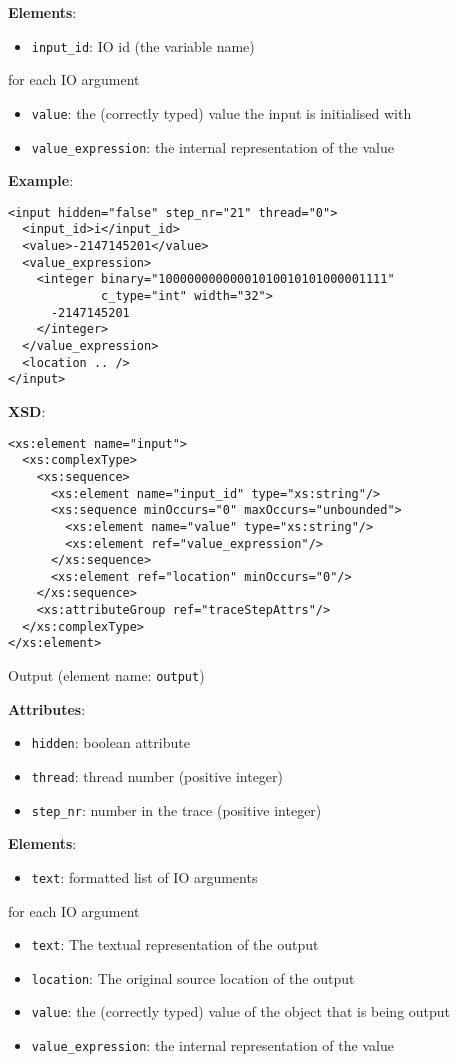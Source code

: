 \documentclass[12pt]{article}
\begin{document}
\noindent\textbf{Elements}:
\begin{itemize}
\item \texttt{input\_id}: IO id (the variable name)
\end{itemize}
for each IO argument
\begin{itemize}
\item \texttt{value}: the (correctly typed) value the input is initialised with
\item \texttt{value\_expression}: the internal representation of the value
\end{itemize}

\noindent\textbf{Example}:
\begin{verbatim}
<input hidden="false" step_nr="21" thread="0">
  <input_id>i</input_id>
  <value>-2147145201</value>
  <value_expression>
    <integer binary="10000000000001010010101000001111"
             c_type="int" width="32">
      -2147145201
    </integer>
  </value_expression>
  <location .. />
</input>
\end{verbatim}

\noindent\textbf{XSD}:
\begin{verbatim}
<xs:element name="input">
  <xs:complexType>
    <xs:sequence>
      <xs:element name="input_id" type="xs:string"/>
      <xs:sequence minOccurs="0" maxOccurs="unbounded">
        <xs:element name="value" type="xs:string"/>
        <xs:element ref="value_expression"/>
      </xs:sequence>
      <xs:element ref="location" minOccurs="0"/>
    </xs:sequence>
    <xs:attributeGroup ref="traceStepAttrs"/>
  </xs:complexType>
</xs:element>
\end{verbatim}


\begin{center}
  {\Large Output} (element name: \texttt{output})
\end{center}

\noindent\textbf{Attributes}:
\begin{itemize}
\item \texttt{hidden}: boolean attribute
\item \texttt{thread}: thread number (positive integer)
\item \texttt{step\_nr}: number in the trace (positive integer)
\end{itemize}

\noindent\textbf{Elements}:
\begin{itemize}
\item \texttt{text}: formatted list of IO arguments
\end{itemize}
for each IO argument
\begin{itemize}
\item \texttt{text}: The textual representation of the output
\item \texttt{location}: The original source location of the output
\item \texttt{value}: the (correctly typed) value of the object that is being output
\item \texttt{value\_expression}: the internal representation of the value
\end{itemize}
\end{document}
